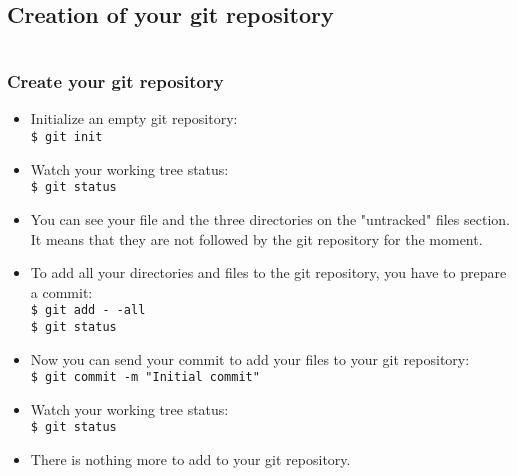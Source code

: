 \documentclass[10pt, hyperref={unicode=true,pdfusetitle, bookmarks=true,bookmarksnumbered=false,bookmarksopen=false, breaklinks=false,pdfborder={0 0 1},backref=true,colorlinks=true,linkcolor=darkblue,pageanchor, urlcolor=darkblue}]{beamer}
\begin{document}
\subsection{{\bf{Creation of your git repository}}}
\begin{frame}
\begin{columns}[c] 
\tableofcontents[sections={1-3},currentsection, currentsubsection]
\tableofcontents[sections={4-8},currentsection, currentsubsection]
\end{columns}
\end{frame}
\begin{frame}
\frametitle{Create your git repository}
\begin{block}{}

\begin{itemize}
\item Initialize an empty git repository:\\
\texttt{\$ git init}\\

\item Watch your working tree status:\\
\texttt{\$ git status}\\

\item You can see your file and the three directories on the "untracked" files section.
It means that they are not followed by the git repository for the moment.

\item To add all your directories and files to the git repository, you have to prepare a commit:\\
\texttt{\$ git add -\,-all}\\
\texttt{\$ git status}\\

\item Now you can send your commit to add your files to your git repository:\\
\texttt{\$ git commit -m "Initial commit"}\\

\item Watch your working tree status:\\
\texttt{\$ git status}

\item There is nothing more to add to your git repository.
\end{itemize}

\end{block}
\end{frame}
\end{document}
